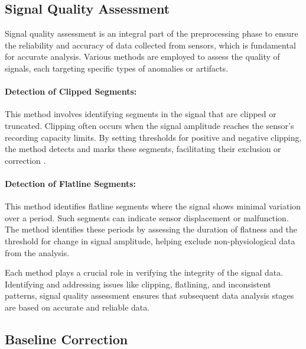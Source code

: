 \subsection*{Signal Quality Assessment}
\label{sec:signal_quality_assessment}

Signal quality assessment is an integral part of the preprocessing phase to ensure the reliability and accuracy of data collected from sensors, which is fundamental for accurate analysis. Various methods are employed to assess the quality of signals, each targeting specific types of anomalies or artifacts.

\paragraph{Detection of Clipped Segments:}
This method involves identifying segments in the signal that are clipped or truncated. Clipping often occurs when the signal amplitude reaches the sensor's recording capacity limits. By setting thresholds for positive and negative clipping, the method detects and marks these segments, facilitating their exclusion or correction .

\paragraph{Detection of Flatline Segments:}
This method identifies flatline segments where the signal shows minimal variation over a period. Such segments can indicate sensor displacement or malfunction. The method identifies these periods by assessing the duration of flatness and the threshold for change in signal amplitude, helping exclude non-physiological data from the analysis.


Each method plays a crucial role in verifying the integrity of the signal data. Identifying and addressing issues like clipping, flatlining, and inconsistent patterns, signal quality assessment ensures that subsequent data analysis stages are based on accurate and reliable data.



\subsection*{Baseline Correction}
\label{sec:baseline_correction}

